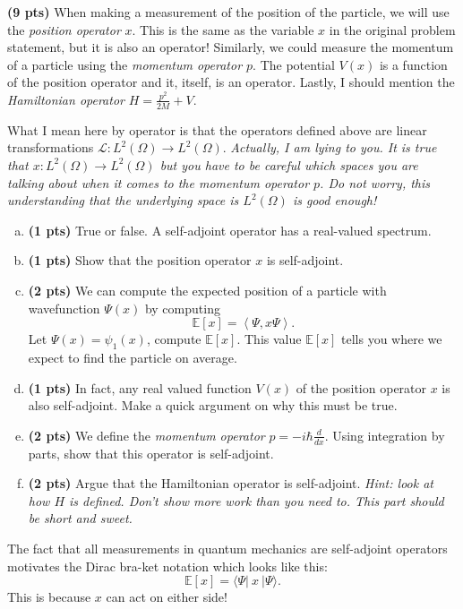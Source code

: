 \documentclass[12pt]{article} %
\newcommand{\innprod}[2]{\left\langle #1, #2\right\rangle}
\begin{document}
\vspace*{1cm}
\begin{problem}
\textbf{(9 pts)}  When making a measurement of the position of the particle, we will use the \emph{position operator} $x$.  This is the same as the variable $x$ in the original problem statement, but it is also an operator! Similarly, we could measure the momentum of a particle using the \emph{momentum operator $p$}. The potential $V(x)$ is a function of the position operator and it, itself, is an operator. Lastly, I should mention the \emph{Hamiltonian operator} $H=\frac{p^2}{2M} + V$. 

What I mean here by operator is that the operators defined above are linear transformations $\mathcal{L} \colon L^2(\Omega) \to L^2(\Omega)$. \emph{Actually, I am lying to you. It is true that $x\colon L^2(\Omega) \to L^2(\Omega)$ but you have to be careful which spaces you are talking about when it comes to the momentum operator $p$. Do not worry, this understanding that the underlying space is $L^2(\Omega)$ is good enough!}
   \begin{enumerate}[(a)]
		\item \textbf{(1 pts)} True or false. A self-adjoint operator has a real-valued spectrum.
   		\item \textbf{(1 pts)} Show that the position operator $x$ is self-adjoint.
   		\item \textbf{(2 pts)} We can compute the expected position of a particle with wavefunction $\Psi(x)$ by computing
   		\[
   		\mathbb{E}[x]=\innprod{\Psi}{x\Psi}.
   		\]
   		Let $\Psi(x) = \psi_1(x)$, compute $\mathbb{E}[x]$. This value $\mathbb{E}[x]$ tells you where we expect to find the particle on average. 
        \item \textbf{(1 pts)} In fact, any real valued function $V(x)$ of the position operator $x$ is also self-adjoint. Make a quick argument on why this must be true.
		\item \textbf{(2 pts)} We define the \emph{momentum operator} $p = -i\hbar \frac{d}{dx}$. Using integration by parts, show that this operator is self-adjoint.
		\item \textbf{(2 pts)} Argue that the Hamiltonian operator is self-adjoint. \emph{Hint: look at how $H$ is defined. Don't show more work than you need to. This part should be short and sweet.}
   	\end{enumerate}
\end{problem}
\begin{remark}
The fact that all measurements in quantum mechanics are self-adjoint operators motivates the Dirac bra-ket notation which looks like this:
\[
\mathbb{E}[x] = \langle \Psi \vert ~x~ \vert \Psi \rangle.
\]
This is because $x$ can act on either side!
\end{remark}
\end{document}
